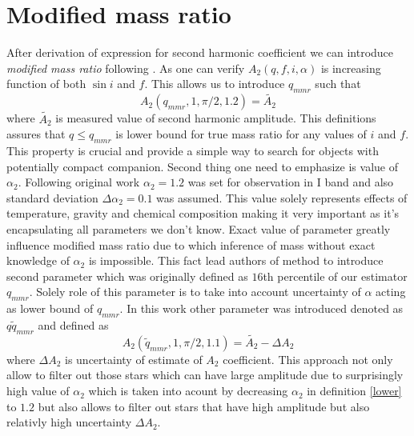 \documentclass{pracalicmgr}
\begin{document}
\section{Modified mass ratio}
\hspace{1cm} After derivation of expression for second harmonic coefficient we can introduce {\it modified mass ratio} following \citep{gomel_search_2021-1}. 
As one can verify $A_2(q,f,i,\alpha)$ is increasing 
function of both $\sin{i}$ and $f$. This allows us to introduce $q_{mmr}$ such that
\begin{equation}\label{qmmr}
    A_2(q_{mmr},1,\pi/2,1.2)=\tilde{A_2}
\end{equation}
where $\tilde{A_2}$ is measured value of second harmonic amplitude.
This definitions assures that $q\leq q_{mmr}$ is lower bound for true mass ratio for any values of $i$ and $f$. 
This property is crucial and provide a simple way to search for objects with potentially compact companion. Second thing 
one need to emphasize is value of $\alpha_2$. Following original work $\alpha_2=1.2$ was set for observation in I band and also standard deviation $\Delta\alpha_2=0.1$
was assumed. This value
solely represents effects of temperature, gravity and chemical composition making it very important as it's encapsulating all parameters we don't know. 
Exact value of parameter greatly influence modified mass ratio due to which inference of mass without exact knowledge of $\alpha_2$ is impossible.
This fact lead authors of method to introduce second parameter which was originally defined as $16$th percentile of our estimator $q_{mmr}$. Solely role of this 
parameter is to take into account uncertainty of $\alpha$ acting as lower bound of $q_{mmr}$. In this work other parameter was introduced denoted as $q\tilde{q}_{mmr}$ and defined as
\begin{equation*}\label{lower}
    A_2(\tilde{q}_{mmr},1,\pi/2,1.1)=\tilde{A_2}-\Delta A_2
\end{equation*}
where $\Delta A_2$ is uncertainty of estimate of $A_2$ coefficient. This approach not only allow to filter out those stars which can have large amplitude due to 
surprisingly high value of $\alpha_2$ which is taken into acount by decreasing $\alpha_2$ in definition \ref{lower} to $1.2$ but also allows to filter out stars
that have high amplitude but also relativly high uncertainty $\Delta A_2$.
\end{document}
